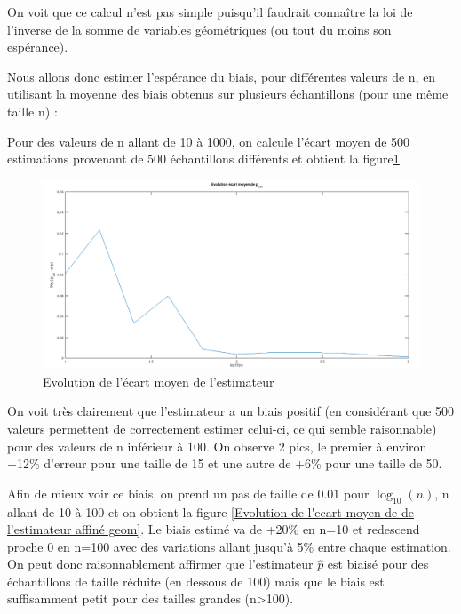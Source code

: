 \documentclass[12pt,a4paper,titlepage]{article}
\numberwithin{equation}{section}
\begin{document}
On voit que ce calcul n'est pas simple puisqu'il
faudrait connaître la loi de l'inverse de la somme de variables géométriques (ou tout du moins son espérance). 

Nous allons donc estimer l'espérance du biais, pour différentes valeurs de n, en utilisant la moyenne des biais obtenus sur plusieurs échantillons (pour une même taille n) :



Pour des valeurs de n allant de 10 à 1000, on calcule l'écart moyen de 500 estimations provenant de 500 échantillons différents et obtient la figure\ref{Evolution de l'écart moyen de de l'estimateur geom}.

\begin{figure}[!h]
\begin{center}
 \includegraphics[scale=0.3]{images/biaisMoyGeom.png} 
\end{center}
 \caption{Evolution de l'écart moyen de l'estimateur}
 \label{Evolution de l'écart moyen de de l'estimateur geom}
\end{figure}

On voit très clairement que l'estimateur a un biais positif (en considérant que 500 valeurs permettent de correctement estimer celui-ci, ce qui semble raisonnable) pour des valeurs de n inférieur à 100. On observe 2 pics, le premier à environ +12\% d'erreur pour une taille de 15 et une autre de +6\% pour une taille de 50.

Afin de mieux voir ce biais, on prend un pas de taille de $0.01$ pour $\log_{10}(n)$, n allant de 10 à 100 et on obtient la figure \ref{Evolution de l'ecart moyen de de l'estimateur affiné geom}. Le biais estimé va de +20\% en n=10 et redescend proche 0 en n=100 avec des variations allant jusqu'à 5\% entre chaque estimation. On peut donc raisonnablement affirmer que l'estimateur $\hat{p}$ est biaisé pour des échantillons de taille réduite (en dessous de 100) mais que le biais est suffisamment petit pour des tailles grandes (n>100).
\end{document}
